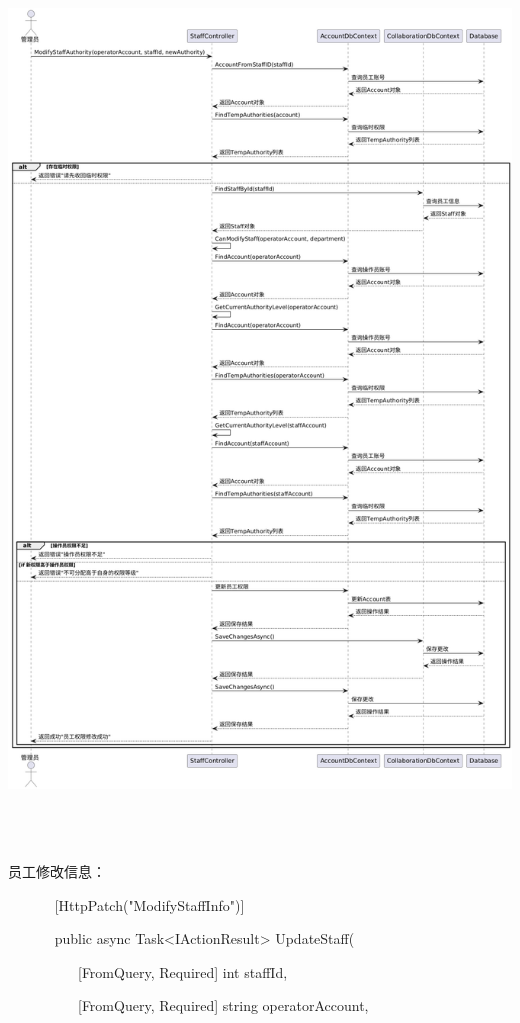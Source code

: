 \documentclass[]{article}
\begin{document}
\includegraphics[width=5.98403in,height=9.26389in]{media/media/image16.png}

员工修改信息：

~ ~ ~ ~ {[}HttpPatch("ModifyStaffInfo"){]}

~ ~ ~ ~ public async Task\textless{}IActionResult\textgreater{}
UpdateStaff(

~ ~ ~ ~ ~ ~ {[}FromQuery, Required{]} int staffId,

~ ~ ~ ~ ~ ~ {[}FromQuery, Required{]} string operatorAccount,
\end{document}
